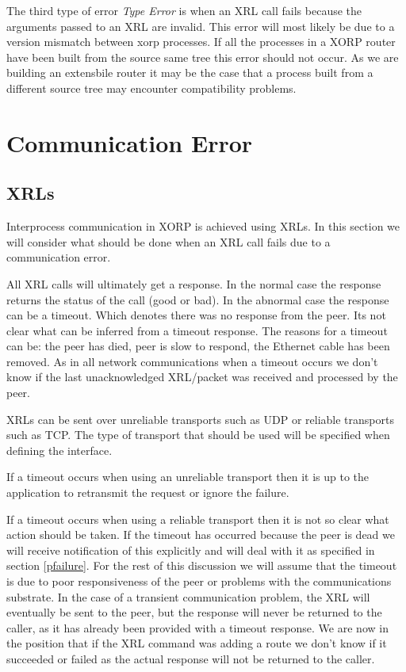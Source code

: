 \documentclass[11pt]{article}
\begin{document}
The third type of error {\em Type Error} is when an XRL call fails
because the arguments passed to an XRL are invalid. This error will
most likely be due to a version mismatch between xorp processes. If
all the processes in a XORP router have been built from the source
same tree this error should not occur. As we are building an
extensbile router it may be the case that a process built from a
different source tree may encounter compatibility problems.

\section{Communication Error}

\subsection{XRLs}

Interprocess communication in XORP is achieved using XRLs. In this
section we will consider what should be done when an XRL call fails
due to a communication error.

All XRL calls will ultimately get a response. In the normal case the
response returns the status of the call (good or bad). In the abnormal
case the response can be a timeout. Which denotes there was no
response from the peer. Its not clear what can be inferred from a
timeout response. The reasons for a timeout can be: the peer has died,
peer is slow to respond, the Ethernet cable has been removed. As in
all network communications when a timeout occurs we don't know if the
last unacknowledged XRL/packet was received and processed by the peer.

XRLs can be sent over unreliable transports such as UDP or reliable
transports such as TCP. The type of transport that should be used will
be specified when defining the interface. 

If a timeout occurs when using an unreliable transport then it is up
to the application to retransmit the request or ignore the failure.

If a timeout occurs when using a reliable transport then it is not so
clear what action should be taken. If the timeout has occurred because
the peer is dead we will receive notification of this explicitly and
will deal with it as specified in section \ref{pfailure}. For the rest
of this discussion we will assume that the timeout is due to poor
responsiveness of the peer or problems with the communications
substrate. In the case of a transient communication problem, the XRL
will eventually be sent to the peer, but the response will never be
returned to the caller, as it has already been provided with a timeout
response. We are now in the position that if the XRL command was
adding a route we don't know if it succeeded or failed as the actual
response will not be returned to the caller.
\end{document}
